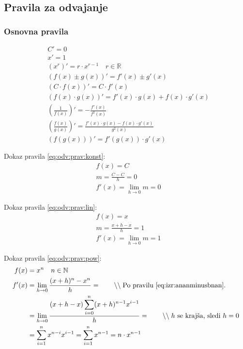 \documentclass[a4paper,oneside,12pt,fleqn]{article}
\def\R{\ensuremath{\mathbb R}}
\def\N{\ensuremath{\mathbb N}}
\newcommand\krat\cdot
\newcommand{\comment}[1]{\ensuremath{\qquad\backslash\backslash\;}\textnormal{#1}}
\def\limh{\lim_{h\rightarrow0}} %
\numberwithin{equation}{section}
\begin{document}
\subsection{Pravila za odvajanje}
\label{sec:odvod:prav}

\subsubsection{Osnovna pravila}
\label{sec:odvod:prav:osn}
\begin{align}
  & C' = 0 \label{eq:odv:prav:konst} \\
  & x' = 1 \label{eq:odv:prav:lin} \\
  & \left( x^r \right)' = r\krat x^{r-1} \quad r \in \R \label{eq:odv:prav:pow} \\
  & (f(x) \pm g(x))' = f'(x) \pm g'(x) \label{eq:odv:prav:sum} \\
  & (C\krat f(x))' = C\krat f'(x) \label{eq:odv:prav:konstkrat} \\
  & (f(x)\krat g(x))' = f'(x)\krat g(x) + f(x)\krat g'(x) \label{eq:odv:prav:krat} \\
  & \left(\frac{1}{f(x)}\right)' = - \frac{f'(x)}{f^2(x)} \label{eq:odv:prav:enaz} \\
  & \left( \frac{f(x)}{g(x)} \right)' = \frac{f'(x)\krat g(x) - f(x)\krat g'(x)}{g^2(x)} \label{eq:odv:prav:del} \\
  & \left( f(g(x)) \right)' = f'(g(x))\krat g'(x) \label{eq:odv:prav:komp}
\end{align}

Dokaz pravila \eqref{eq:odv:prav:konst}:
\begin{align*}
  & f(x) = C \\
  & m = \frac{C - C}{h} = 0 \\
  & f'(x) = \limh  m = 0
\end{align*}

Dokaz pravila \eqref{eq:odv:prav:lin}:
\begin{align*}
  & f(x) = x \\
  & m = \frac{x+h-x}{h} = 1 \\
  & f'(x) = \limh  m = 1
\end{align*}

Dokaz pravila \eqref{eq:odv:prav:pow}:
\begin{align*}
  f(x) &= x^n  \quad n \in \N \\
  f'(x) &= \limh  \frac{(x+h)^n - x^n}{h} = \comment{Po pravilu \eqref{eq:izr:ananminusbnan}.} \\
  &= \limh  \frac{(x+h-x)\displaystyle\sum_{i=0}^n (x+h)^{n-1}x^{i-1}}{h} = \comment{$h$ se krajša, sledi $h = 0$} \\
  &= \sum_{i=1}^nx^{n-i}x^{i-1} = \sum_{i=1}^nx^{n-1} = n\krat x^{n-1}
\end{align*}
\end{document}
